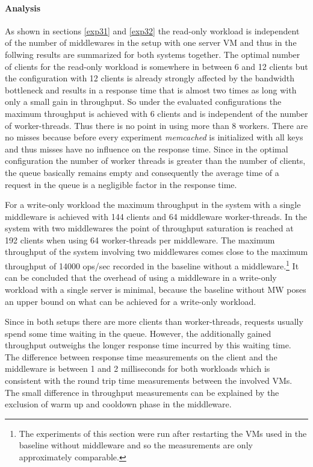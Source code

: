 \documentclass[report.tex]{subfiles}
\begin{document}
\paragraph{Analysis}

As shown in sections \ref{exp31} and \ref{exp32} the read-only workload is independent of the number of middlewares in the setup with one server VM and thus in the follwing results are summarized for both systems together.
The optimal number of clients for the read-only workload is somewhere in between 6 and 12 clients but the configuration with 12 clients is already strongly affected by the bandwidth bottleneck and results in a response time that is almost two times as long with only a small gain in throughput. So under the evaluated configurations the maximum throughput is achieved with 6 clients and is independent of the number of worker-threads. Thus there is no point in using more than 8 workers. 
There are no misses because before every experiment \emph{memcached} is initialized with all keys and thus misses have no influence on the response time. Since in the optimal configuration the number of worker threads is greater than the number of clients, the queue basically remains empty and consequently the average time of a request in the queue is a negligible factor in the response time.

For a write-only workload the maximum throughput  in the system with a single middleware is achieved with 144 clients and 64 middleware worker-threads. In the system with two middlewares the point of throughput saturation is reached at 192 clients when using 64 worker-threads per middleware. The maximum throughput of the system involving two middlewares comes close to the maximum throughput of 14000 ops/sec recorded in the baseline without a middleware.\footnote{The experiments of this section were run after restarting the VMs used in the baseline without middleware and so the measurements are only approximately comparable.} 
It can be concluded that the overhead of using a middleware in a write-only workload with a single server is minimal, because the baseline without MW poses an upper bound on what can be achieved for a write-only workload.

Since in both setups there are more clients than worker-threads, requests usually spend some time waiting in the queue. However, the additionally gained throughput outweighs the longer response time incurred by this waiting time.
The difference between response time measurements on the client and the middleware is between 1 and 2 milliseconds for both workloads which is consistent with the round trip time measurements between the involved VMs. The small difference in throughput measurements can be explained by the exclusion of warm up and cooldown phase in the middleware. 
\end{document}
